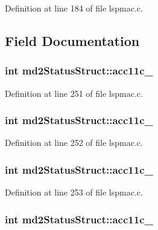 Definition at line 184 of file lspmac.c.

\subsection{Field Documentation}
\hypertarget{structmd2StatusStruct_a69fc2e30a5de0a11c992d133e7a761cd}{
\subsubsection[{acc11c\_\-1}]{\setlength{\rightskip}{0pt plus 5cm}int {\bf md2StatusStruct::acc11c\_}}}
\label{structmd2StatusStruct_a69fc2e30a5de0a11c992d133e7a761cd}


Definition at line 251 of file lspmac.c.\hypertarget{structmd2StatusStruct_ad186f06cb4670b00b8af8264d1da66a4}{
\subsubsection[{acc11c\_\-2}]{\setlength{\rightskip}{0pt plus 5cm}int {\bf md2StatusStruct::acc11c\_}}}
\label{structmd2StatusStruct_ad186f06cb4670b00b8af8264d1da66a4}


Definition at line 252 of file lspmac.c.\hypertarget{structmd2StatusStruct_a20a15620e12888f61c0aed1e47e97932}{
\subsubsection[{acc11c\_\-3}]{\setlength{\rightskip}{0pt plus 5cm}int {\bf md2StatusStruct::acc11c\_}}}
\label{structmd2StatusStruct_a20a15620e12888f61c0aed1e47e97932}


Definition at line 253 of file lspmac.c.\hypertarget{structmd2StatusStruct_ab09c1342dc12052b8f5b35f78ef95000}{
\subsubsection[{acc11c\_\-5}]{\setlength{\rightskip}{0pt plus 5cm}int {\bf md2StatusStruct::acc11c\_}}}
\label{structmd2StatusStruct_ab09c1342dc12052b8f5b35f78ef95000}


